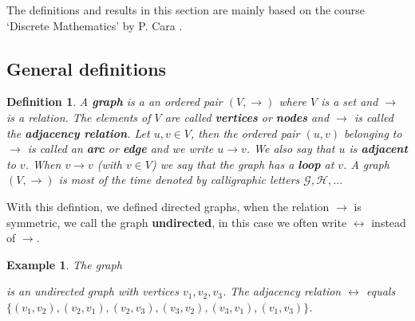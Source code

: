 \documentclass[a4paper,11pt]{report}
\newtheorem{example}[theorem]{Example}
\newtheorem{definition}[theorem]{Definition}
\begin{document}
The definitions and results in this section are mainly based on the course 
`Discrete Mathematics' by P. Cara \cite{cara}. 


\subsection{General definitions}
\begin{definition}\label{defgraf}
  A \textbf{graph} is a an ordered pair $(V,\rightarrow)$ where $V$ is a set and $\to$ is a relation. The elements of $V$ are called
 \textbf{vertices} or \textbf{nodes} and $\rightarrow$ is called the \textbf{adjacency relation}. Let $u, v \in V$, then the ordered pair 
 $(u, v)$ belonging to $\to$ is called an \textbf{arc} or \textbf{edge} and we write $u \rightarrow v$. We also
 say that $u$ is \textbf{adjacent} to $v$.  When $v \to v$ (with $v \in V$) we say that the graph has a 
 \textbf{loop} at $v$. A graph $(V,\rightarrow)$ is 
  most of the time denoted by calligraphic letters $\mathscr{G}, 
  \mathscr{H},..$.   \end{definition}
With this defintion, we defined directed graphs, when the relation $\rightarrow$ is symmetric, 
 we call the graph \textbf{undirected}, in this case we often write $\leftrightarrow$ instead 
 of $\rightarrow$.  
 
 
 \begin{example}\label{simpelegraf}
  The graph
  \begin{center}

\end{center}
is an undirected graph with vertices $v_1, v_2, v_3$. The adjacency 
relation $\leftrightarrow$ equals \\$\{(v_1,v_2), (v_2,v_1), (v_2, v_3), (v_3,v_2), (v_3, v_1), 
(v_1,v_3)\}$.
\end{example}
\end{document}
